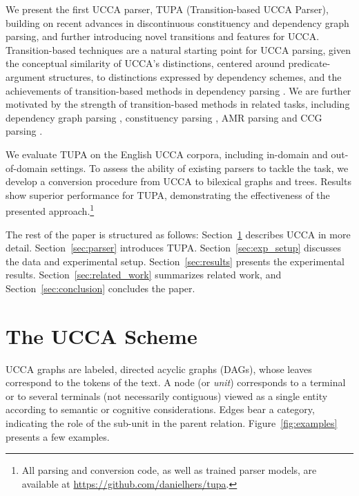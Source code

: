 \documentclass[11pt,a4paper]{article}
\newcommand{\parser}[1]{TUPA\textsubscript{#1}}
\newcommand{\secref}[1]{Section~\ref{#1}}
\newcommand{\figref}[1]{Figure~\ref{#1}}
\begin{document}
We present the first UCCA parser, \parser{}
(Transition-based UCCA Parser),
building on recent advances in discontinuous constituency
and dependency graph parsing, and further introducing novel transitions and features for UCCA.
Transition-based techniques are a natural
starting point for UCCA parsing, given the conceptual similarity of
UCCA's distinctions, centered around predicate-argument structures, to distinctions expressed
by dependency schemes, and the achievements of transition-based methods in dependency parsing
\cite{dyer2015transition,andor2016globally,kiperwasser2016simple}.
We are further motivated by the strength of transition-based methods
in related tasks, including dependency graph parsing
\cite{sagae2008shift,ribeyre-villemontedelaclergerie-seddah:2014:SemEval,tokgoz2015transition},
constituency parsing \cite{sagae2005classifier,zhang2009transition,zhu2013fast,maier2015discontinuous,maier-lichte:2016:DiscoNLP},
AMR parsing \cite{wang-xue-pradhan:2015:ACL-IJCNLP,wang2015transition,wang-EtAl:2016:SemEval,dipendra2016neural,goodman2016noise,zhou2016amr,damonte-17}
and CCG parsing \cite{zhang2011shift,ambati2015incremental,ambati-deoskar-steedman:2016:N16-1}.

We evaluate \parser{} on the English UCCA corpora, including in-domain and out-of-domain settings.
To assess the ability of existing
parsers to tackle the task, we develop a conversion procedure
from UCCA to bilexical graphs and trees.
Results show superior performance for \parser{}, demonstrating the effectiveness of
the presented approach.\footnote{All parsing and conversion code, as well as trained parser models,
are available at \url{https://github.com/danielhers/tupa}.}

The rest of the paper is structured as follows:
\secref{sec:ucca} describes UCCA in more detail.
\secref{sec:parser} introduces \parser{}.
\secref{sec:exp_setup} discusses the data and experimental setup.
\secref{sec:results} presents the experimental results.
\secref{sec:related_work} summarizes related work, and
\secref{sec:conclusion} concludes the paper.




\section{The UCCA Scheme}\label{sec:ucca}

UCCA graphs are labeled, directed acyclic graphs (DAGs),
whose leaves correspond to the tokens of
the text. A node (or {\it unit}) corresponds to a terminal or
to several terminals (not necessarily contiguous) viewed as a
single entity according to semantic or cognitive considerations.
Edges bear a category, indicating the role of the sub-unit in the parent relation.
\figref{fig:examples} presents a few examples.
\end{document}
